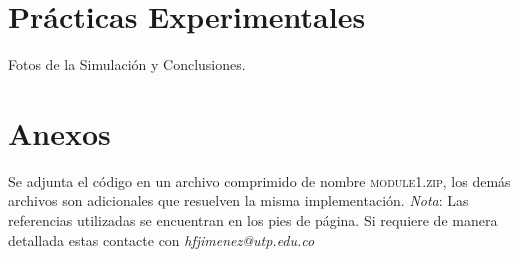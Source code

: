 \documentclass[paper=a4, fontsize=12pt]{article} 		%
\numberwithin{equation}{section}						%
\numberwithin{table}{section} 							%
\begin{document}
\section{Prácticas Experimentales}
Fotos de la Simulación y Conclusiones.
\section{Anexos}
Se adjunta el código en un archivo comprimido de nombre \textsc{module1.zip}, los demás archivos son adicionales que resuelven la misma implementación.
\textit{Nota}: Las referencias utilizadas se encuentran en los pies de página. Si requiere de manera detallada estas contacte con \emph{hfjimenez@utp.edu.co}
\end{document}
